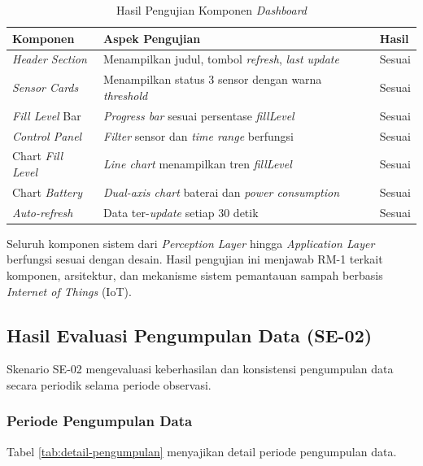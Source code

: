 \begin{table}[H]
  \caption{Hasil Pengujian Komponen \textit{Dashboard}}
  \label{tab:hasil-ui}
  \begin{tabularx}{\textwidth}{| l | X | l |}
    \hline
    \textbf{Komponen} & \textbf{Aspek Pengujian} & \textbf{Hasil} \\
    \hline
    \textit{Header Section}   & Menampilkan judul, tombol \textit{refresh}, \textit{last update} & Sesuai \\
    \hline
    \textit{Sensor Cards}     & Menampilkan status 3 sensor dengan warna \textit{threshold} & Sesuai \\
    \hline
    \textit{Fill Level} Bar   & \textit{Progress bar} sesuai persentase \textit{fillLevel} & Sesuai \\
    \hline
    \textit{Control Panel}    & \textit{Filter} sensor dan \textit{time range} berfungsi & Sesuai \\
    \hline
    Chart \textit{Fill Level} & \textit{Line chart} menampilkan tren \textit{fillLevel} & Sesuai \\
    \hline
    Chart \textit{Battery}    & \textit{Dual-axis chart} baterai dan \textit{power consumption} & Sesuai \\
    \hline
    \textit{Auto-refresh}     & Data ter-\textit{update} setiap 30 detik & Sesuai \\
    \hline
  \end{tabularx}
\end{table}

Seluruh komponen sistem dari \textit{Perception Layer} hingga \textit{Application Layer} berfungsi sesuai dengan desain. Hasil pengujian ini menjawab RM-1 terkait komponen, arsitektur, dan mekanisme sistem pemantauan sampah berbasis \textit{Internet of Things} (IoT).

\subsection{Hasil Evaluasi Pengumpulan Data (SE-02)}

Skenario SE-02 mengevaluasi keberhasilan dan konsistensi pengumpulan data secara periodik selama periode observasi.

\subsubsection{Periode Pengumpulan Data}

Tabel \ref{tab:detail-pengumpulan} menyajikan detail periode pengumpulan data.


